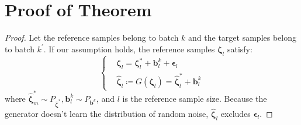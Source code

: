 \documentclass{article}
\begin{document}
\section{Proof of Theorem}
\begin{proof}
Let the reference samples belong to batch $k$ and the target samples belong to batch $k^\prime$.
If our assumption holds, the reference samples $\bm{\zeta}_l$ satisfy:
\begin{equation}
    \begin{cases}
        & \bm{\zeta}_l = \bm{\zeta}_l^* + \bm{b}_l^k + \bm{\epsilon}_l \\
        &  \widehat{\bm{\zeta}}_l \coloneqq G(\bm{\zeta}_l) = \widehat{\bm{\zeta}}_l^* + \bm{b}_l^k
    \end{cases}
\end{equation}
where $\widehat{\bm{\zeta}}_m^* \sim P_{\widehat{\bm{\zeta}}^*}, \bm{b}_l^k \sim P_{\bm{b}^k}$, and $l$ is the reference sample size.
Because the generator doesn't learn the distribution of random noise, $\widehat{\bm{\zeta}}_l$ excludes $\bm{\epsilon}_l$.


\end{proof}
\end{document}
